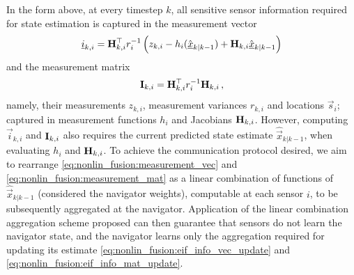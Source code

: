 In the form above, at every timestep $k$, all sensitive sensor information required for state estimation is captured in the measurement vector
\begin{equation}\label{eq:nonlin_fusion:measurement_vec}
    {\underline{i}}_{k,i} = {{\mathbf{H}}}^\top_{k,i} r^{-1}_i \left(z_{k,i} - h_i(\hat{{\underline{x}}}_{k|k-1}) + {{\mathbf{H}}}_{k,i}\hat{{\underline{x}}}_{k|k-1}\right)
\end{equation}
and the measurement matrix
\begin{equation}\label{eq:nonlin_fusion:measurement_mat}
    {\ensuremath{{\mathbf{I}}}}_{k,i} = {{\mathbf{H}}}^\top_{k,i} r^{-1}_i {{\mathbf{H}}}_{k,i}\,,
\end{equation}
namely, their measurements $z_{k,i}$, measurement variances $r_{k,i}$ and locations $\vec{s}_i$; captured in measurement functions $h_i$ and Jacobians ${{\mathbf{H}}}_{k,i}$. However, computing $\vec{i}_{k,i}$ and ${{\mathbf{I}}}_{k,i}$ also requires the current predicted state estimate $\hat{\vec{x}}_{k|k-1}$, when evaluating $h_i$ and ${{\mathbf{H}}}_{k,i}$. To achieve the communication protocol desired, we aim to rearrange \eqref{eq:nonlin_fusion:measurement_vec} and \eqref{eq:nonlin_fusion:measurement_mat} as a linear combination of functions of $\hat{\vec{x}}_{k|k-1}$ (considered the navigator weights), computable at each sensor $i$, to be subsequently aggregated at the navigator. Application of the linear combination aggregation scheme proposed can then guarantee that sensors do not learn the navigator state, and the navigator learns only the aggregation required for updating its estimate \eqref{eq:nonlin_fusion:eif_info_vec_update} and \eqref{eq:nonlin_fusion:eif_info_mat_update}.

% 
% 

